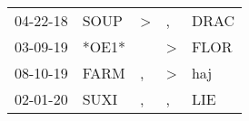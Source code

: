 \begin{supertabular}{p{0.07\textwidth}p{0.06\textwidth}p{0.02\textwidth}p{0.02\textwidth}p{0.06\textwidth}}
 04-22-18\textsuperscript{} &           SOUP\textsuperscript{} &  \textgreater &             , &  DRAC\textsuperscript{} \\
 03-09-19\textsuperscript{} &                            *OE1* &               &  \textgreater &  FLOR\textsuperscript{} \\
 08-10-19\textsuperscript{} &           FARM\textsuperscript{} &             , &  \textgreater &   haj\textsuperscript{} \\
 02-01-20\textsuperscript{} &           SUXI\textsuperscript{} &             , &             , &   LIE\textsuperscript{} \\
\end{supertabular}
